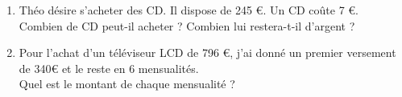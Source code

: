 \documentclass[11pt]{article}
\begin{document}
\begin{exercice}
\begin{multicols}{2}
\begin{enumerate}
\item Théo désire s’acheter des CD. Il dispose de 245 €. Un CD coûte 7 €.\\
Combien de CD peut-il acheter ? Combien lui restera-t-il d’argent ?
\item Pour l’achat d’un téléviseur LCD de 796 €, j’ai donné un premier
versement de 340€ et le reste en 6 mensualités. \\
Quel est le montant de chaque mensualité ?
\end{enumerate}
\end{multicols}
\end{exercice}
\end{document}
